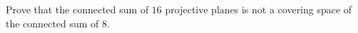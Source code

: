 Prove that the connected sum of $16$ projective planes is not a
covering space of the connected sum of $8$. 
